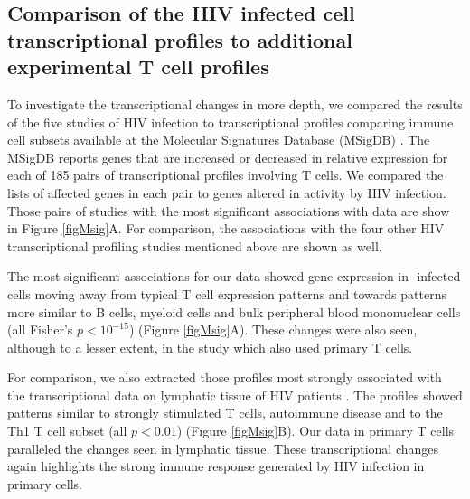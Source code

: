 \documentclass[../sherrill-Mix_thesis.tex]{subfiles}
\begin{document}
	\subsection{Comparison of the HIV infected cell transcriptional profiles to addit\-ional experimental T cell profiles}
		To investigate the transcriptional changes in more depth, we compared the results of the five studies of HIV infection to transcriptional profiles comparing immune cell subsets available at the Molecular Signatures Database (MSigDB) \citep{Subramanian2005}. The MSigDB reports genes that are increased or decreased in relative expression for each of 185 pairs of transcriptional profiles involving \cdFour{} T cells.  We compared the lists of affected genes in each pair to genes altered in activity by HIV infection. Those pairs of studies with the most significant associations with \hivEight{} data are show in Figure \ref{figMsig}A.  For comparison, the associations with the four other HIV transcriptional profiling studies mentioned above are shown as well.

		The most significant associations for our data showed gene expression in \hivEight{}-infected cells moving away from typical T cell expression patterns and towards patterns more similar to B cells, myeloid cells and bulk peripheral blood mononuclear cells (all Fisher's $p<10^{-15}$) (Figure \ref{figMsig}A). These changes were also seen, although to a lesser extent, in the \citet{Imbeault2009} study which also used primary \cdFour{} T cells.

		For comparison, we also extracted those profiles most strongly associated with the transcriptional data on lymphatic tissue of HIV patients \citep{Li2009}. The profiles showed patterns similar to strongly stimulated T cells, autoimmune disease and to the Th1 T cell subset (all $p<0.01$) (Figure \ref{figMsig}B). Our data in primary \cdFour{} T cells paralleled the changes seen in lymphatic tissue. These transcriptional changes again highlights the strong immune response generated by HIV infection in primary cells.
		
\end{document}

